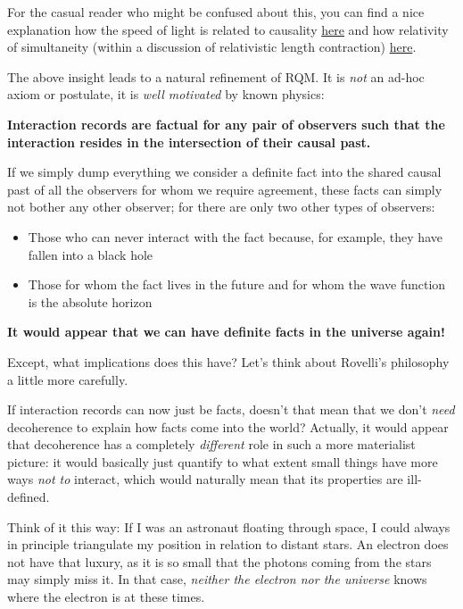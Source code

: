 \documentclass{article}
\begin{document}
For the casual reader who might be confused about this, you can find a nice explanation how the speed of light is related to causality \href{https://www.youtube.com/watch?v=msVuCEs8Ydo}{here} and how relativity of simultaneity (within a discussion of relativistic length contraction) \href{https://www.youtube.com/watch?v=TxW6_E3uLuo}{here}.

The above insight leads to a natural refinement of RQM. It is \textit{not} an ad-hoc axiom or postulate, it is \textit{well motivated} by known physics:

\textbf{Interaction records are factual for any pair of observers such that the interaction resides in the intersection of their causal past.}

If we simply dump everything we consider a definite fact into the shared causal past of all the observers for whom we require agreement, these facts can simply not bother any other observer; for there are only two other types of observers:

\begin{itemize}
\item Those who can never interact with the fact because, for example, they have fallen into a black hole  
\item Those for whom the fact lives in the future and for whom the wave function is the absolute horizon
\end{itemize}

\textbf{It would appear that we can have definite facts in the universe again!}

Except, what implications does this have? Let's think about Rovelli's philosophy a little more carefully.

If interaction records can now just be facts, doesn't that mean that we don't \textit{need} decoherence to explain how facts come into the world? Actually, it would appear that decoherence has a completely \textit{different} role in such a more materialist picture: it would basically just quantify to what extent small things have more ways \textit{not to} interact, which would naturally mean that its properties are ill-defined.

Think of it this way: If I was an astronaut floating through space, I could always in principle triangulate my position in relation to distant stars. An electron does not have that luxury, as it is so small that the photons coming from the stars may simply miss it. In that case, \textit{neither the electron nor the universe} knows where the electron is at these times.
\end{document}
